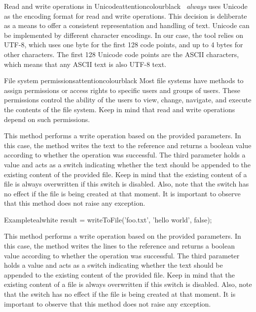 \begin{description}
\begin{messagebox}{Read and write operations in Unicode}{attentioncolour}{\icattention}{black}
\arara\ \emph{always} uses Unicode as the encoding format for read and write operations. This decision is deliberate as a means to offer a consistent representation and handling of text. Unicode can be implemented by different character encodings. In our case, the tool relies on UTF-8, which uses one byte for the first 128 code points, and up to 4 bytes for other characters. The first 128 Unicode code points are the ASCII characters, which means that any ASCII text is also UTF-8 text.
\end{messagebox}

\begin{messagebox}{File system permissions}{attentioncolour}{\icattention}{black}
Most file systems have methods to assign permissions or access rights to specific users and groups of users. These permissions control the ability of the users to view, change, navigate, and execute the contents of the file system. Keep in mind that read and write operations depend on such permissions.
\end{messagebox}

\item[\mdbox{R}{writeToFile(String reference, String text, boolean append)}{boolean}] This method performs a write operation based on the provided parameters. In this case, the method writes the  text to the  reference and returns a boolean value according to whether the operation was successful. The third parameter holds a  value and acts as a switch indicating whether the text should be appended to the existing content of the provided file. Keep in mind that the existing content of a file is always overwritten if this switch is disabled. Also, note that the switch has no effect if the file is being created at that moment. It is important to observe that this method does not raise any exception.

\begin{codebox}{Example}{teal}{\icnote}{white}
result = writeToFile('foo.txt', 'hello world', false);
\end{codebox}

\item[\mdbox{R}{writeToFile(File file, List<String> lines, boolean append)}{boolean}] This method performs a write operation based on the provided parameters. In this case, the method writes the  lines to the  reference and returns a boolean value according to whether the operation was successful. The third parameter holds a  value and acts as a switch indicating whether the text should be appended to the existing content of the provided file. Keep in mind that the existing content of a file is always overwritten if this switch is disabled. Also, note that the switch has no effect if the file is being created at that moment. It is important to observe that this method does not raise any exception.


\end{description}
